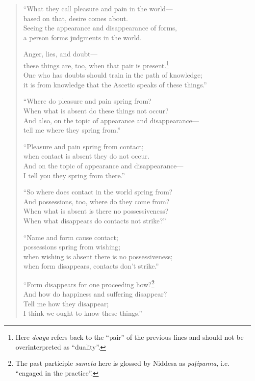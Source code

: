 \documentclass[12pt,openany]{book}%
\begin{document}
\begin{verse}
“What they call pleasure and pain in the world—\\
based on that, desire comes about. \\
Seeing the appearance and disappearance of forms, \\
a person forms judgments in the world. 

Anger, lies, and doubt—\\
these things are, too, when that pair is present.\footnote{Here \textit{dvaya} refers back to the “pair” of the previous lines and should not be overinterpreted as “duality”. } \\
One who has doubts should train in the path of knowledge; \\
it is from knowledge that the Ascetic speaks of these things.” 

“Where do pleasure and pain spring from? \\
When what is absent do these things not occur? \\
And also, on the topic of appearance and disappearance—\\
tell me where they spring from.” 

“Pleasure and pain spring from contact; \\
when contact is absent they do not occur. \\
And on the topic of appearance and disappearance—\\
I tell you they spring from there.” 

“So where does contact in the world spring from? \\
And possessions, too, where do they come from? \\
When what is absent is there no possessiveness? \\
When what disappears do contacts not strike?” 

“Name and form cause contact; \\
possessions spring from wishing; \\
when wishing is absent there is no possessiveness; \\
when form disappears, contacts don’t strike.” 

“Form disappears for one proceeding how?\footnote{The past participle \textit{sameta} here is glossed by Niddesa as \textit{\textsanskrit{paṭipanna}}, i.e. “engaged in the practice”. } \\
And how do happiness and suffering disappear? \\
Tell me how they disappear; \\
I think we ought to know these things.” 


\end{verse}
\end{document}
